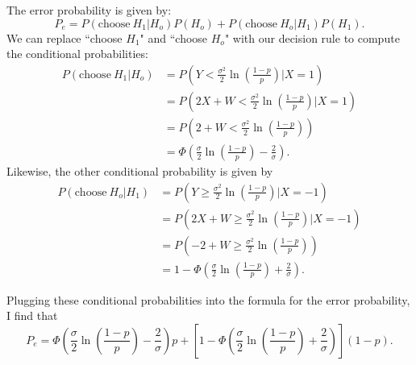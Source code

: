 \begin{problem}{14}  The error probability is given by:
\begin{equation*}
P_e = P(\mathrm{choose}~ H_1|H_o)P(H_o)+P(\mathrm{choose}~ H_o|H_1)P(H_1).
\end{equation*}
We can replace ``choose $H_1$" and ``choose $H_o$" with our decision rule to compute the conditional probabilities:
\begin{align*}
P(\mathrm{choose}~ H_1|H_o) &= P\left(Y<\frac{\sigma^2}{2} \ln \left(\frac{1-p}{p}\right)\Big|X=1\right) \\
&= P\left(2X+W<\frac{\sigma^2}{2} \ln \left(\frac{1-p}{p}\right)\Big|X=1\right) \\
&= P\left(2+W<\frac{\sigma^2}{2} \ln \left(\frac{1-p}{p}\right)\right) \\
& = \Phi \left(\frac{\sigma}{2}\ln \left(\frac{1-p}{p}\right) -\frac{2}{\sigma} \right).
\end{align*}
Likewise, the other conditional probability is given by
\begin{align*}
P(\mathrm{choose}~ H_o|H_1) &= P\left(Y \ge \frac{\sigma^2}{2} \ln \left(\frac{1-p}{p}\right)\Big|X=-1\right) \\
&= P\left(2X+W \ge \frac{\sigma^2}{2} \ln \left(\frac{1-p}{p}\right)\Big|X=-1\right) \\
&= P\left(-2+W\ge \frac{\sigma^2}{2} \ln \left(\frac{1-p}{p}\right)\right) \\
& = 1-\Phi \left(\frac{\sigma}{2}\ln \left(\frac{1-p}{p}\right) +\frac{2}{\sigma} \right).
\end{align*}

Plugging these conditional probabilities into the formula for the error probability, I find that
\begin{equation*}
P_e = \Phi \left(\frac{\sigma}{2}\ln \left(\frac{1-p}{p}\right) -\frac{2}{\sigma} \right)p+ \left[1-\Phi \left(\frac{\sigma}{2}\ln \left(\frac{1-p}{p}\right) +\frac{2}{\sigma} \right) \right](1-p).
\end{equation*}

\end{problem}

